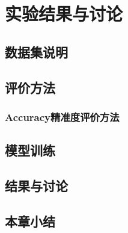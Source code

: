 
\chapter{实验结果与讨论}

\section{数据集说明}
\section{评价方法}

\subsection{Accuracy精准度评价方法}

\section{模型训练}

\section{结果与讨论}

\section{本章小结}
